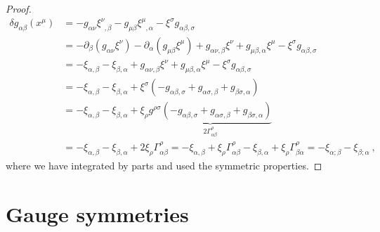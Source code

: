 \begin{proof}
\begin{equation*}
\begin{aligned}
            \delta g_{\alpha\beta} (x^\mu) & = - g_{\alpha\nu} \xi^\nu_{\phantom \nu, \beta} - g_{\mu\beta} \xi^\mu_{\phantom \mu, \alpha} - \xi^\sigma g_{\alpha\beta, \sigma} \\ & = - \partial_\beta (g_{\alpha\nu} \xi^\nu) -\partial_\alpha (g_{\mu\beta} \xi^\mu) + g_{\alpha\nu, \beta} \xi^\nu + g_{\mu\beta,\alpha} \xi^\mu - \xi^\sigma g_{\alpha\beta,\sigma} \\ & = - \xi_{\alpha,\beta} - \xi_{\beta,\alpha} + g_{\alpha\nu, \beta} \xi^\nu + g_{\mu\beta,\alpha} \xi^\mu - \xi^\sigma g_{\alpha\beta,\sigma} \\ & = - \xi_{\alpha,\beta} - \xi_{\beta,\alpha} + \xi^{\sigma} (- g_{\alpha\beta,\sigma} + g_{\alpha\sigma,\beta} + g_{\beta\sigma,\alpha} ) \\ & = - \xi_{\alpha,\beta} - \xi_{\beta,\alpha} + \xi_{\rho} \underbrace{g^{\rho\sigma} (- g_{\alpha\beta,\sigma} + g_{\alpha\sigma,\beta} + g_{\beta\sigma,\alpha} )}_{2 \Gamma^\rho_{\alpha\beta}} \\ & = - \xi_{\alpha,\beta} - \xi_{\beta,\alpha} +  2 \xi_{\rho} \Gamma^\rho_{\alpha\beta} = - \xi_{\alpha,\beta} + \xi_{\rho} \Gamma^\rho_{\alpha\beta} - \xi_{\beta,\alpha} + \xi_{\rho} \Gamma^\rho_{\beta\alpha} = - \xi_{\alpha;\beta} - \xi_{\beta;\alpha} ~,
        \end{aligned}
        \end{equation*}
        where we have integrated by parts and used the symmetric properties.
    \end{proof}

\section{Gauge symmetries}

